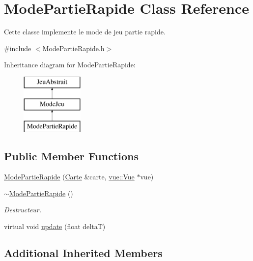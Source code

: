 \hypertarget{class_mode_partie_rapide}{\section{Mode\-Partie\-Rapide Class Reference}
\label{class_mode_partie_rapide}
}


Cette classe implemente le mode de jeu partie rapide.  




{\ttfamily \#include $<$Mode\-Partie\-Rapide.\-h$>$}

Inheritance diagram for Mode\-Partie\-Rapide\-:\begin{figure}[H]
\begin{center}
\leavevmode
\includegraphics[height=3.000000cm]{class_mode_partie_rapide}
\end{center}
\end{figure}
\subsection*{Public Member Functions}
\begin{DoxyCompactItemize}
\item 
\hyperlink{group__inf2990_gadb7774a33794e3ddf9353793ef83b23d}{Mode\-Partie\-Rapide} (\hyperlink{class_carte}{Carte} \&carte, \hyperlink{classvue_1_1_vue}{vue\-::\-Vue} $\ast$vue)
\item 
\hypertarget{group__inf2990_gabc7e696677c98e01f2059feac1c42bef}{\hyperlink{group__inf2990_gabc7e696677c98e01f2059feac1c42bef}{$\sim$\-Mode\-Partie\-Rapide} ()}\label{group__inf2990_gabc7e696677c98e01f2059feac1c42bef}

\begin{DoxyCompactList}\small\item\em Destructeur. \end{DoxyCompactList}\item 
virtual void \hyperlink{group__inf2990_gade3ae69aad6fa916631e29fd9be850c9}{update} (float delta\-T)
\end{DoxyCompactItemize}
\subsection*{Additional Inherited Members}


